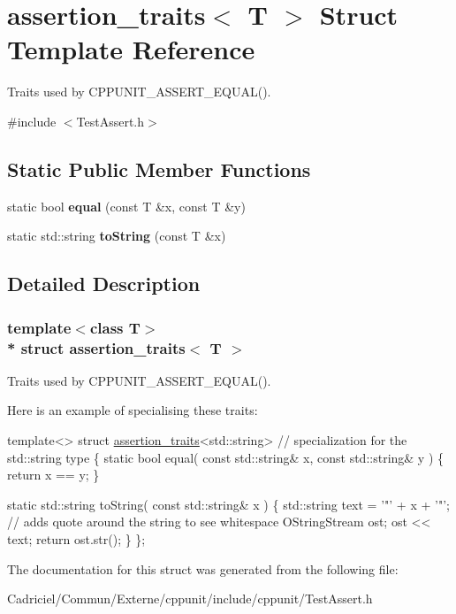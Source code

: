 \hypertarget{structassertion__traits}{}\section{assertion\+\_\+traits$<$ T $>$ Struct Template Reference}
\label{structassertion__traits}


Traits used by C\+P\+P\+U\+N\+I\+T\+\_\+\+A\+S\+S\+E\+R\+T\+\_\+\+E\+Q\+U\+A\+L().  




{\ttfamily \#include $<$Test\+Assert.\+h$>$}

\subsection*{Static Public Member Functions}
\begin{DoxyCompactItemize}
\item 
static bool {\bfseries equal} (const T \&x, const T \&y)\hypertarget{structassertion__traits_a287c07a4e171256a0128201c7e4c4228}{}\label{structassertion__traits_a287c07a4e171256a0128201c7e4c4228}

\item 
static std\+::string {\bfseries to\+String} (const T \&x)\hypertarget{structassertion__traits_a1c96296fb44902b4f22d99b9c3cc7749}{}\label{structassertion__traits_a1c96296fb44902b4f22d99b9c3cc7749}

\end{DoxyCompactItemize}


\subsection{Detailed Description}
\subsubsection*{template$<$class T$>$\\*
struct assertion\+\_\+traits$<$ T $>$}

Traits used by C\+P\+P\+U\+N\+I\+T\+\_\+\+A\+S\+S\+E\+R\+T\+\_\+\+E\+Q\+U\+A\+L(). 

Here is an example of specialising these traits\+:


\begin{DoxyCode}
\textcolor{keyword}{template}<>
\textcolor{keyword}{struct }\hyperlink{structassertion__traits}{assertion\_traits}<std::string>   \textcolor{comment}{// specialization for the std::string type}
\{
  \textcolor{keyword}{static} \textcolor{keywordtype}{bool} equal( \textcolor{keyword}{const} std::string& x, \textcolor{keyword}{const} std::string& y )
  \{
    \textcolor{keywordflow}{return} x == y;
  \}

  \textcolor{keyword}{static} std::string toString( \textcolor{keyword}{const} std::string& x )
  \{
    std::string text = \textcolor{charliteral}{'"'} + x + \textcolor{charliteral}{'"'};    \textcolor{comment}{// adds quote around the string to see whitespace}
    OStringStream ost;
    ost << text;
    \textcolor{keywordflow}{return} ost.str();
  \}
\};
\end{DoxyCode}
 

The documentation for this struct was generated from the following file\+:\begin{DoxyCompactItemize}
\item 
Cadriciel/\+Commun/\+Externe/cppunit/include/cppunit/Test\+Assert.\+h\end{DoxyCompactItemize}
